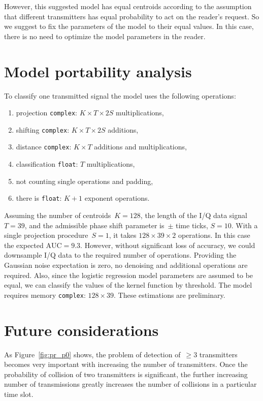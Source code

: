\documentclass[12pt]{article}
\begin{document}
However, this suggested model has equal centroids according to the assumption that different transmitters has equal probability to act on the reader's request. So we suggest to fix the parameters of the model to their equal values. In this case, there is no need to optimize the model parameters in the reader. 

\section{Model portability analysis}
To classify one transmitted signal the model uses the following operations:
\begin{enumerate}[1)]
\item projection \texttt{complex}: $K \times T \times 2S$ multiplications,
\item shifting \texttt{complex}: $K \times T \times 2S$ additions,
\item distance  \texttt{complex}: $K \times T$ additions and multiplications,
\item classification \texttt{float}: $T$  multiplications,
\item not counting single operations and padding,
\item there is \texttt{float}: $K+1$ exponent operations.
\end{enumerate}
Assuming the number of centroids~$K=128$, the length of the I/Q data signal $T=39$, and the admissible phase shift parameter is~$\pm$ time ticks, $S=10$. %
With a single projection procedure~$S=1$, it takes $128\times 39 \times 2$ operations. In this case the expected \mbox{$\text{AUC}=9.3$}. However, without significant loss of accuracy, we could downsample I/Q data to the required number of operations. Providing the Gaussian noise expectation is zero, no denoising and additional operations are required. Also, since the logistic regression model parameters are assumed to be equal, we can classify the values of the kernel function by threshold. 
The model requires memory \texttt{complex}: $128\times 39$. %
These estimations are preliminary. 

\section{Future considerations}\label{ICA}
As Figure~\ref{fig:pr_p0} shows, the problem of detection of~$\geq 3$ transmitters becomes very important with increasing the number of transmitters. Once the probability of collision of two transmitters is significant, the further increasing number of transmissions greatly increases the number of collisions in a particular time slot.
\end{document}
